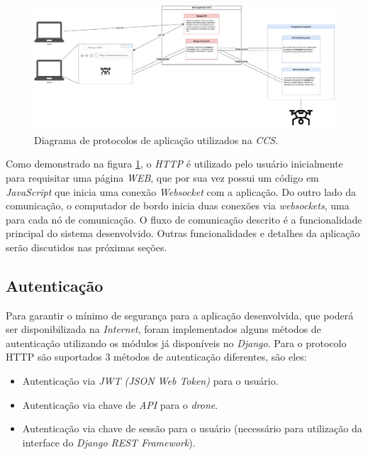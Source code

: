 \documentclass[12pt,a4paper,oneside]{book}
\begin{document}
%
\begin{figure}[H]
  \centering
  \includegraphics[width=1\textwidth]{Images/Diagramas/CCS_protocol_ARQ.png}
  \caption{Diagrama de protocolos de aplicação utilizados na \textit{CCS}.}
  \label{fig:CCS_protocol_ARQ.png.0}
\end{figure}
%

Como demonstrado na figura \ref{fig:CCS_protocol_ARQ.png.0}, o \textit{HTTP} é utilizado pelo usuário inicialmente para requisitar uma página \textit{WEB}, que por sua vez possui um código em \textit{JavaScript} que inicia uma conexão \textit{Websocket} com a aplicação. Do outro lado da comunicação, o computador de bordo inicia duas conexões via \textit{websockets}, uma para cada nó de comunicação. O fluxo de comunicação descrito é a funcionalidade principal do sistema desenvolvido. Outras funcionalidades e detalhes da aplicação serão discutidos nas próximas seções.

\newpage

\subsection{Autenticação}

Para garantir o mínimo de segurança para a aplicação desenvolvida, que poderá ser disponibilizada na \textit{Internet}, foram implementados alguns métodos de autenticação utilizando os módulos já disponíveis no \textit{Django}. Para o protocolo HTTP são suportados 3 métodos de autenticação diferentes, são eles:
\begin{itemize}
    \item Autenticação via \textit{JWT (JSON Web Token)} para o usuário. 
    \item Autenticação via chave de \textit{API} para o \textit{drone}.
    \item Autenticação via chave de sessão para o usuário (necessário para utilização da interface do \textit{Django REST Framework}). 
\end{itemize}
\end{document}
